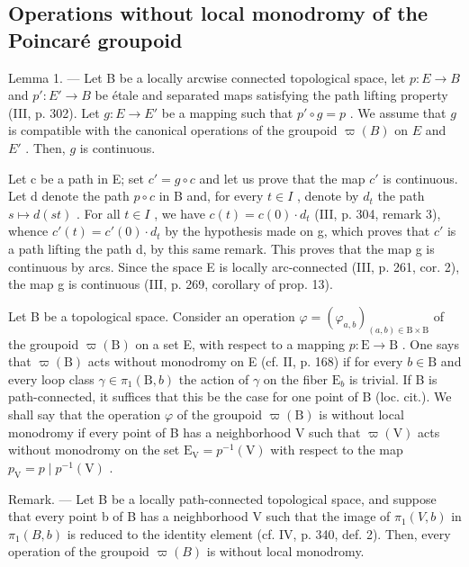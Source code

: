 \subsection{Operations without local monodromy of the Poincaré groupoid}

Lemma 1. --- Let B be a locally arcwise connected topological space, let \(p \colon E \to B\) and \(p' \colon E' \to B\) be étale and separated maps satisfying the path lifting property (III, p. 302). Let \(g \colon E \to E'\) be a mapping such that \(p' \circ g = p\) . We assume that \(g\) is compatible with the canonical operations of the groupoid \(\varpi(B)\) on \(E\) and \(E'\) . Then, \(g\) is continuous.

Let c be a path in E; set \(c' = g \circ c\) and let us prove that the map \(c'\) is continuous. Let d denote the path \(p \circ c\) in B and, for every \(t \in I\) , denote by \(d_t\) the path \(s \mapsto d(st)\) . For all \(t \in I\) , we have \(c(t) = c(0) \cdot d_t\) (III, p. 304, remark 3), whence \(c'(t) = c'(0) \cdot d_t\) by the hypothesis made on g, which proves that \(c'\) is a path lifting the path d, by this same remark. This proves that the map g is continuous by arcs. Since the space E is locally arc-connected (III, p. 261, cor. 2), the map g is continuous (III, p. 269, corollary of prop. 13).

Let B be a topological space. Consider an operation \(\varphi = (\varphi_{a,b})_{(a,b)\in \mathrm{B}\times \mathrm{B}}\) of the groupoid \(\varpi (\mathrm{B})\) on a set E, with respect to a mapping \(p\colon \mathrm{E}\to \mathrm{B}\) . One says that \(\varpi (\mathrm{B})\) acts without monodromy on E (cf. II, p. 168) if for every \(b\in \mathrm{B}\) and every loop class \(\gamma \in \pi_1(\mathrm{B},b)\) the action of \(\gamma\) on the fiber \(\mathrm{E}_b\) is trivial. If B is path-connected, it suffices that this be the case for one point of B (loc. cit.). We shall say that the operation \(\varphi\) of the groupoid \(\varpi (\mathrm{B})\) is without local monodromy if every point of B has a neighborhood V such that \(\varpi (\mathrm{V})\) acts without monodromy on the set \(\mathrm{E_V} = p^{-1}(\mathrm{V})\) with respect to the map \(p_{\mathrm{V}} = p\mid p^{-1}(\mathrm{V})\) .

Remark. --- Let B be a locally path-connected topological space, and suppose that every point b of B has a neighborhood V such that the image of \(\pi_{1}(V,b)\) in \(\pi_{1}(B,b)\) is reduced to the identity element (cf. IV, p. 340, def. 2). Then, every operation of the groupoid \(\varpi(B)\) is without local monodromy.

